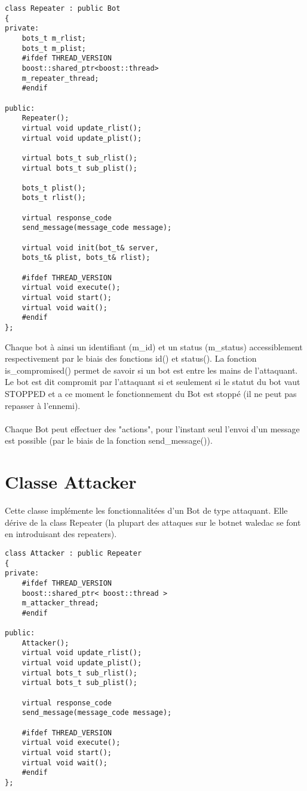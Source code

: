\documentclass[11pt]{article}
\begin{document}
\begin{minipage}[c]{.46\linewidth}
\begin{verbatim} 
class Repeater : public Bot
{
private:
	bots_t m_rlist;
	bots_t m_plist;
	#ifdef THREAD_VERSION
	boost::shared_ptr<boost::thread> 
	m_repeater_thread;
	#endif

public:
	Repeater();
	virtual void update_rlist();
	virtual void update_plist();
	
	virtual bots_t sub_rlist();
	virtual bots_t sub_plist();
	
	bots_t plist();
	bots_t rlist();
	
	virtual response_code 
	send_message(message_code message);
	
	virtual void init(bot_t& server, 
	bots_t& plist, bots_t& rlist);
	
	#ifdef THREAD_VERSION
	virtual void execute();
	virtual void start();
	virtual void wait();
	#endif
};
\end{verbatim}	
\end{minipage} \hfill
\begin{minipage}[c]{.46\linewidth}
Chaque bot à ainsi un identifiant (m\_id) et un status (m\_status) accessiblement respectivement par le biais des fonctions id() et status(). La fonction is\_compromised() permet de savoir si un bot est entre les mains de l'attaquant. Le bot est dit compromit par l'attaquant si et seulement si le statut du bot vaut STOPPED et a ce moment le fonctionnement du Bot est stoppé (il ne peut pas repasser à l'ennemi).\\\\Chaque Bot peut effectuer des "actions", pour l'instant seul l'envoi d'un message est possible (par le biais de la fonction send\_message()).
\end{minipage}

\newpage
\section{Classe Attacker}
Cette classe implémente les fonctionnalitées d'un Bot de type attaquant. Elle dérive de la class Repeater (la plupart des attaques sur le botnet waledac se font en introduisant des repeaters).\\

\begin{minipage}[c]{.46\linewidth}
\begin{verbatim} 
class Attacker : public Repeater
{
private:
	#ifdef THREAD_VERSION
	boost::shared_ptr< boost::thread > 
	m_attacker_thread;
	#endif

public:
	Attacker();
	virtual void update_rlist();
	virtual void update_plist();
	virtual bots_t sub_rlist();
	virtual bots_t sub_plist();
	
	virtual response_code 
	send_message(message_code message);
	
	#ifdef THREAD_VERSION
	virtual void execute();
	virtual void start();
	virtual void wait();
	#endif
};
\end{verbatim}	
\end{minipage} \hfill
\begin{minipage}[c]{.46\linewidth}

\end{minipage}
\end{document}
